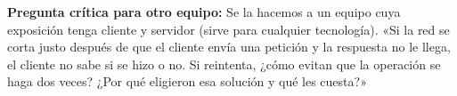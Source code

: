 \noindent\textbf{Pregunta crítica para otro equipo:} Se la hacemos a un equipo cuya exposición tenga cliente y servidor (sirve para cualquier tecnología). «Si la red se corta justo después de que el cliente envía una petición y la respuesta no le llega, el cliente no sabe si se hizo o no. Si reintenta, ¿cómo evitan que la operación se haga dos veces? ¿Por qué eligieron esa solución y qué les cuesta?»